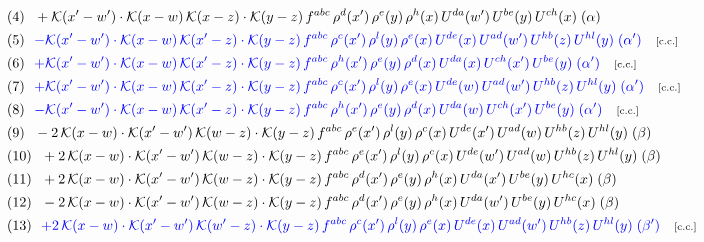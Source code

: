 \documentclass[9pt]{article}
\begin{document}
\begin{align}
&\quad\text{(4)}\ \ +\mathcal{K}(x'-w')\cdot \mathcal{K}(x-w)\,\mathcal{K}(x-z)\cdot \mathcal{K}(y-z)\,f^{abc}\, \rho^{d}(x')\, \rho^{e}(y)\,\rho^{h}(x)\, U^{da}(w')\,U^{be}(y)\,U^{ch}(x)\;(\alpha)\notag\\
&\quad\text{(5)}\ \ \textcolor{blue}{-\mathcal{K}(x'-w')\cdot\mathcal{K}(x-w)\,\mathcal{K}(x'-z)\cdot\mathcal{K}(y-z)\, f^{abc}\,\rho^{c}(x')\,\rho^{l}(y)\,\rho^{e}(x)\,U^{de}(x)\,U^{ad}(w')\,U^{hb}(z)\,U^{hl}(y)\;(\alpha')}\quad\text{\scriptsize[c.c.]}\notag\\
&\quad\text{(6)}\ \ \textcolor{blue}{+\mathcal{K}(x'-w')\cdot\mathcal{K}(x-w)\,\mathcal{K}(x'-z)\cdot\mathcal{K}(y-z)\, f^{abc}\,\rho^{h}(x')\,\rho^{e}(y)\,\rho^{d}(x)\,U^{da}(x)\,U^{ch}(x')\,U^{be}(y)\;(\alpha')}\quad\text{\scriptsize[c.c.]}\notag\\
&\quad\text{(7)}\ \ \textcolor{blue}{+\mathcal{K}(x'-w')\cdot\mathcal{K}(x-w)\,\mathcal{K}(x'-z)\cdot\mathcal{K}(y-z)\, f^{abc}\,\rho^{c}(x')\,\rho^{l}(y)\,\rho^{e}(x)\,U^{de}(w)\,U^{ad}(w')\,U^{hb}(z)\,U^{hl}(y)\;(\alpha')}\quad\text{\scriptsize[c.c.]}\notag\\
&\quad\text{(8)}\ \ \textcolor{blue}{-\mathcal{K}(x'-w')\cdot\mathcal{K}(x-w)\,\mathcal{K}(x'-z)\cdot\mathcal{K}(y-z)\, f^{abc}\,\rho^{h}(x')\,\rho^{e}(y)\,\rho^{d}(x)\,U^{da}(w)\,U^{ch}(x')\,U^{be}(y)\;(\alpha')}\quad\text{\scriptsize[c.c.]}\notag\\
&\quad\text{(9)}\ \ -2\,\mathcal{K}(x-w)\cdot \mathcal{K}(x'-w')\, \mathcal{K}(w-z)\cdot \mathcal{K}(y-z)\, f^{abc}\,\rho^{e}(x')\,\rho^{l}(y)\,\rho^{c}(x)\, U^{de}(x')\,U^{ad}(w)\,U^{hb}(z)\,U^{hl}(y)\;(\beta)\notag\\
&\quad\text{(10)}\ \ +2\,\mathcal{K}(x-w)\cdot \mathcal{K}(x'-w')\, \mathcal{K}(w-z)\cdot \mathcal{K}(y-z)\, f^{abc}\,\rho^{e}(x')\,\rho^{l}(y)\,\rho^{c}(x)\, U^{de}(w')\,U^{ad}(w)\,U^{hb}(z)\,U^{hl}(y)\;(\beta)\notag\\
&\quad\text{(11)}\ \ +2\,\mathcal{K}(x-w)\cdot \mathcal{K}(x'-w')\, \mathcal{K}(w-z)\cdot \mathcal{K}(y-z)\, f^{abc}\,\rho^{d}(x')\,\rho^{e}(y)\,\rho^{h}(x)\, U^{da}(x')\,U^{be}(y)\,U^{hc}(x)\;(\beta)\notag\\
&\quad\text{(12)}\ \ -2\,\mathcal{K}(x-w)\cdot \mathcal{K}(x'-w')\, \mathcal{K}(w-z)\cdot \mathcal{K}(y-z)\, f^{abc}\,\rho^{d}(x')\,\rho^{e}(y)\,\rho^{h}(x)\, U^{da}(w')\,U^{be}(y)\,U^{hc}(x)\;(\beta)\notag\\
&\quad\text{(13)}\ \ \textcolor{blue}{+2\,\mathcal{K}(x-w)\cdot\mathcal{K}(x'-w')\,\mathcal{K}(w'-z)\cdot\mathcal{K}(y-z)\, f^{abc}\,\rho^{c}(x')\,\rho^{l}(y)\,\rho^{e}(x)\,U^{de}(x)\,U^{ad}(w')\,U^{hb}(z)\,U^{hl}(y)\;(\beta')}\quad\text{\scriptsize[c.c.]}\notag\\

\end{align}
\end{document}
